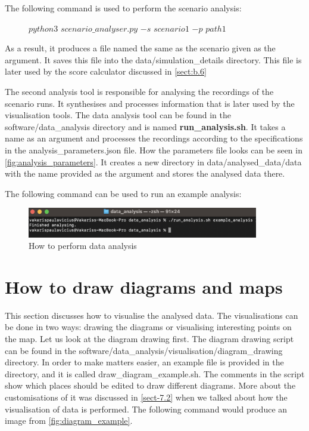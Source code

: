 The following command is used to perform the scenario analysis:

\begin{figure} [h]
    \centering
    $python3$ $scenario\_analyser.py$ $-s$ $scenario1$ $-p$ $path1$
\end{figure}

As a result, it produces a file named the same as the scenario given as the argument. It saves this file into the data/simulation\_details directory. This file is later used by the score calculator discussed in \autoref{sect:b.6}

The second analysis tool is responsible for analysing the recordings of the scenario runs. It synthesises and processes information that is later used by the visualisation tools. The data analysis tool can be found in the software/data\_analysis directory and is named \textbf{run\_analysis.sh}. It takes a name as an argument and processes the recordings according to the specifications in the analysis\_parameters.json file. How the parameters file looks can be seen in \autoref{fig:analysis_parameters}. It creates a new directory in data/analysed\_data/data with the name provided as the argument and stores the analysed data there. 

The following command can be used to run an example analysis:

\begin{figure} [h]
    \centering
    \includegraphics[width = 0.9\textwidth]{research_paper/Images/data_analysis_how_to.png}
    \caption{How to perform data analysis}
\end{figure}

\section{How to draw diagrams and maps} \label{sect:b.5}
This section discusses how to visualise the analysed data. The visualisations can be done in two ways: drawing the diagrams or visualising interesting points on the map. Let us look at the diagram drawing first. The diagram drawing script can be found in the software/data\_analysis/visualisation/diagram\_drawing directory. In order to make matters easier, an example file is provided in the directory, and it is called draw\_diagram\_example.sh. The comments in the script show which places should be edited to draw different diagrams. More about the customisations of it was discussed in \autoref{sect-7.2} when we talked about how the visualisation of data is performed. The following command would produce an image from \autoref{fig:diagram_example}.

